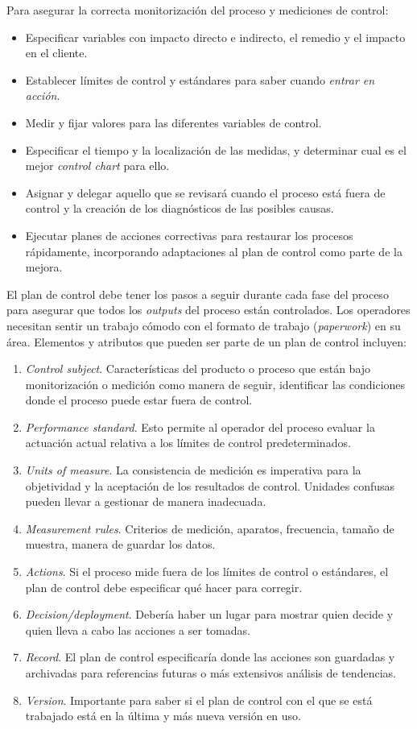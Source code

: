 \documentclass[]{article}
\begin{document}
Para asegurar la correcta monitorización del proceso y mediciones de control:
\begin{itemize}
	\item Especificar variables con impacto directo e indirecto, el remedio y el impacto en el cliente.
	\item Establecer límites de control y estándares para saber cuando \textit{entrar en acción}.
	\item Medir y fijar valores para las diferentes variables de control.
	\item Especificar el tiempo y la localización de las medidas, y determinar cual es el mejor \textit{control chart} para ello.
	\item Asignar y delegar aquello que se revisará cuando el proceso está fuera de control y la creación de los diagnósticos de las posibles causas.
	\item Ejecutar planes de acciones correctivas para restaurar los procesos rápidamente, incorporando adaptaciones al plan de control como parte de la mejora.
\end{itemize}

El plan de control debe tener los pasos a seguir durante cada fase del proceso para asegurar que todos los \textit{outputs} del proceso están controlados. Los operadores necesitan sentir un trabajo cómodo con el formato de trabajo (\textit{paperwork}) en su área. Elementos y atributos que pueden ser parte de un plan de control incluyen:
\begin{enumerate}
	\item \textit{Control subject}. Características del producto o proceso que están bajo monitorización o medición como manera de seguir, identificar las condiciones donde el proceso puede estar fuera de control.
	\item \textit{Performance standard}. Esto permite al operador del proceso evaluar la actuación actual relativa a los límites de control predeterminados.
	\item \textit{Units of measure}. La consistencia de medición es imperativa para la objetividad y la aceptación de los resultados de control. Unidades confusas pueden llevar a gestionar de manera inadecuada.
	\item \textit{Measurement rules}. Criterios de medición, aparatos, frecuencia, tamaño de muestra, manera de guardar los datos.
	\item \textit{Actions}. Si el proceso mide fuera de los límites de control o estándares, el plan de control debe especificar qué hacer para corregir.
	\item \textit{Decision/deployment}. Debería haber un lugar para mostrar quien decide y quien lleva a cabo las acciones a ser tomadas.
	\item \textit{Record}. El plan de control especificaría donde las acciones son guardadas y archivadas para referencias futuras o más extensivos análisis de tendencias.
	\item \textit{Version}. Importante para saber si el plan de control con el que se está trabajado está en la última y más nueva versión en uso.
\end{enumerate}
\end{document}
